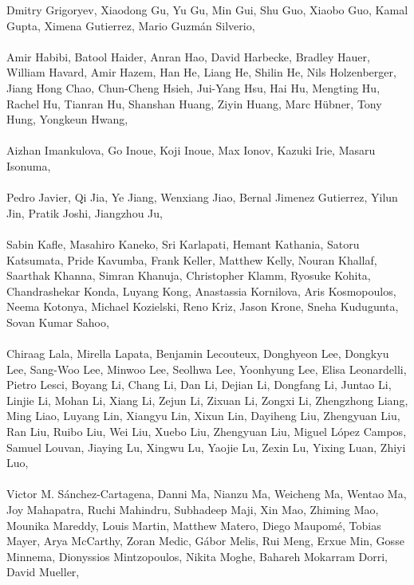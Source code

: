 \documentclass[11pt]{article}
\begin{document}
\begin{description}[itemsep=4mm, style=nextline]
Dmitry Grigoryev, 
Xiaodong Gu, 
Yu Gu, 
Min Gui, 
Shu Guo, 
Xiaobo Guo, 
Kamal Gupta, 
Ximena Gutierrez, 
Mario Guzmán Silverio, 
\\
\\
Amir Habibi, 
Batool Haider, 
Anran Hao, 
David Harbecke, 
Bradley Hauer, 
William Havard, 
Amir Hazem, 
Han He, 
Liang He, 
Shilin He, 
Nils Holzenberger, 
Jiang Hong Chao, 
Chun-Cheng Hsieh, 
Jui-Yang Hsu, 
Hai Hu, 
Mengting Hu, 
Rachel Hu, 
Tianran Hu, 
Shanshan Huang, 
Ziyin Huang, 
Marc Hübner, 
Tony Hung, 
Yongkeun Hwang, 
\\
\\
Aizhan Imankulova, 
Go Inoue, 
Koji Inoue, 
Max Ionov, 
Kazuki Irie, 
Masaru Isonuma, 
\\
\\
Pedro Javier, 
Qi Jia, 
Ye Jiang, 
Wenxiang Jiao, 
Bernal Jimenez Gutierrez, 
Yilun Jin, 
Pratik Joshi, 
Jiangzhou Ju, 
\\
\\
Sabin Kafle, 
Masahiro Kaneko, 
Sri Karlapati, 
Hemant Kathania, 
Satoru Katsumata, 
Pride Kavumba, 
Frank Keller, 
Matthew Kelly, 
Nouran Khallaf, 
Saarthak Khanna, 
Simran Khanuja, 
Christopher Klamm, 
Ryosuke Kohita, 
Chandrashekar Konda, 
Luyang Kong, 
Anastassia Kornilova, 
Aris Kosmopoulos, 
Neema Kotonya, 
Michael Kozielski, 
Reno Kriz, 
Jason Krone, 
Sneha Kudugunta, 
Sovan Kumar Sahoo, 
\\
\\
Chiraag Lala, 
Mirella Lapata, 
Benjamin Lecouteux, 
Donghyeon Lee, 
Dongkyu Lee, 
Sang-Woo Lee, 
Minwoo Lee, 
Seolhwa Lee, 
Yoonhyung Lee, 
Elisa Leonardelli, 
Pietro Lesci, 
Boyang Li, 
Chang Li, 
Dan Li, 
Dejian Li, 
Dongfang Li, 
Juntao Li, 
Linjie Li, 
Mohan Li, 
Xiang Li, 
Zejun Li, 
Zixuan Li, 
Zongxi Li, 
Zhengzhong Liang, 
Ming Liao, 
Luyang Lin, 
Xiangyu Lin, 
Xixun Lin, 
Dayiheng Liu, 
Zhengyuan Liu, 
Ran Liu, 
Ruibo Liu, 
Wei Liu, 
Xuebo Liu, 
Zhengyuan Liu, 
Miguel López Campos, 
Samuel Louvan, 
Jiaying Lu, 
Xingwu Lu, 
Yaojie Lu, 
Zexin Lu, 
Yixing Luan, 
Zhiyi Luo, 
\\
\\
Victor M. Sánchez-Cartagena, 
Danni Ma, 
Nianzu Ma, 
Weicheng Ma, 
Wentao Ma, 
Joy Mahapatra, 
Ruchi Mahindru, 
Subhadeep Maji, 
Xin Mao, 
Zhiming Mao, 
Mounika Mareddy, 
Louis Martin, 
Matthew Matero, 
Diego Maupomé, 
Tobias Mayer, 
Arya McCarthy, 
Zoran Medic, 
Gábor Melis, 
Rui Meng, 
Erxue Min, 
Gosse Minnema, 
Dionyssios Mintzopoulos, 
Nikita Moghe, 
Bahareh Mokarram Dorri, 
David Mueller, 
\\

\end{description}
\end{document}
